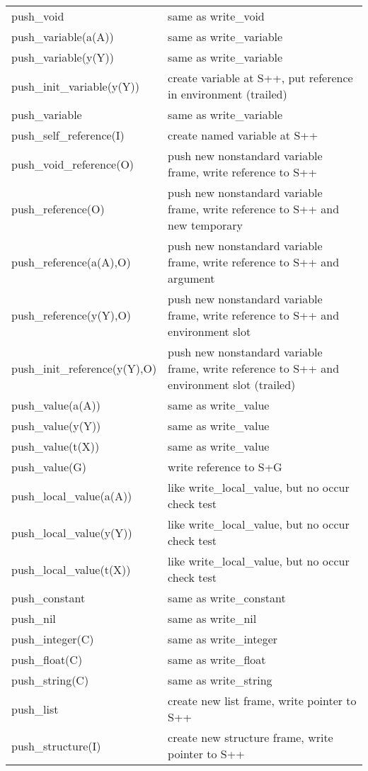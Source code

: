 \begin{tabular}{|p{}|p{}|}
\hline
push_void                       & same as write_void \\
push_variable(a(A))             & same as write_variable \\
push_variable(y(Y))             & same as write_variable \\
push_init_variable(y(Y))        & create variable at S++, put reference in environment (trailed) \\
push_variable                   & same as write_variable \\
push_self_reference(I)          & create named variable at S++ \\
push_void_reference(O)          & push new nonstandard variable frame, write reference to S++ \\
push_reference(O)               & push new nonstandard variable frame, write reference to S++ and new temporary \\
push_reference(a(A),O)          & push new nonstandard variable frame, write reference to S++ and argument \\
push_reference(y(Y),O)          & push new nonstandard variable frame, write reference to S++ and environment slot \\
push_init_reference(y(Y),O)     & push new nonstandard variable frame, write reference to S++ and environment slot (trailed) \\
push_value(a(A))                & same as write_value \\
push_value(y(Y))                & same as write_value \\
push_value(t(X))                & same as write_value \\
push_value(G)                   & write reference to S+G \\
push_local_value(a(A))          & like write_local_value, but no occur check test \\
push_local_value(y(Y))          & like write_local_value, but no occur check test \\
push_local_value(t(X))          & like write_local_value, but no occur check test \\
push_constant                   & same as write_constant \\
push_nil                        & same as write_nil \\
push_integer(C)                 & same as write_integer \\
push_float(C)                   & same as write_float \\
push_string(C)                  & same as write_string \\
push_list                       & create new list frame, write pointer to S++ \\
push_structure(I)               & create new structure frame, write pointer to S++ \\
\hline
\end{tabular}


